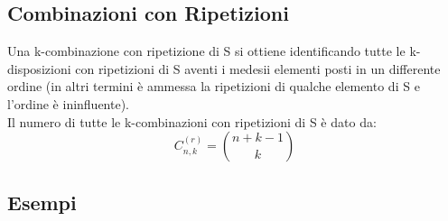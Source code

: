 \subsection{Combinazioni con Ripetizioni}
Una k-combinazione con ripetizione di S si ottiene identificando tutte le k-disposizioni con ripetizioni di S aventi i medesii elementi posti in un differente ordine (in altri termini è ammessa la ripetizioni di qualche elemento di S e l'ordine è ininfluente).\\
Il numero di tutte le k-combinazioni con ripetizioni di S è dato da:
$$ C_{n,k}^{(r)} = \binom{n+k-1}{k} $$

\subsection{Esempi}
\blindtext

